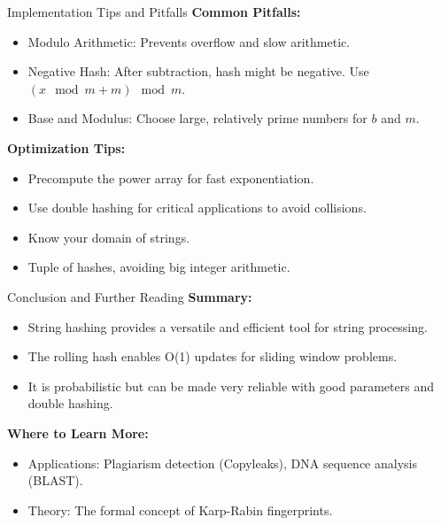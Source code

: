 \documentclass{beamer}
\begin{document}
\begin{frame}{Implementation Tips and Pitfalls}
    \textbf{Common Pitfalls:}
    \begin{itemize}
        \item \alert{Modulo Arithmetic:} Prevents overflow and slow arithmetic.
        \item \alert{Negative Hash:} After subtraction, hash might be negative. Use $(x \mod m + m) \mod m$.
        \item \alert{Base and Modulus:} Choose large, relatively prime numbers for $b$ and $m$.
    \end{itemize}

    \textbf{Optimization Tips:}
    \begin{itemize}
        \item Precompute the \alert{power array} for fast exponentiation.
        \item Use \alert{double hashing} for critical applications to avoid collisions.
        \item Know your domain of strings.
        \item \alert{Tuple of hashes}, avoiding big integer arithmetic.
    \end{itemize}
\end{frame}

\begin{frame}{Conclusion and Further Reading}
    \textbf{Summary:}
    \begin{itemize}
        \item String hashing provides a \alert{versatile and efficient} tool for string processing.
        \item The \alert{rolling hash} enables O(1) updates for sliding window problems.
        \item It is \alert{probabilistic} but can be made very reliable with good parameters and double hashing.
    \end{itemize}

    \vspace{5pt}
    \textbf{Where to Learn More:}
    \begin{itemize}
        \item \alert{Applications:} Plagiarism detection (Copyleaks), DNA sequence analysis (BLAST).
        \item \alert{Theory:} The formal concept of \alert{Karp-Rabin fingerprints}.
    \end{itemize}
\end{frame}
	
\end{document}
